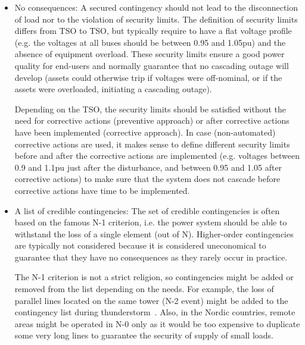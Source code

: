 \begin{itemize}
    \item No consequences: A secured contingency should not lead to the disconnection of load nor to the violation of security limits. The definition of security limits differs from TSO to TSO, but typically require to have a flat voltage profile (e.g. the voltages at all buses should be between 0.95 and 1.05pu) and the absence of equipment overload. These security limits ensure a good power quality for end-users and normally guarantee that no cascading outage will develop (assets could otherwise trip if voltages were off-nominal, or if the assets were overloaded, initiating a cascading outage).

    Depending on the TSO, the security limits should be satisfied without the need for corrective actions (preventive approach) or after corrective actions have been implemented (corrective approach). In case (non-automated) corrective actions are used, it makes sense to define different security limits before and after the corrective actions are implemented (e.g. voltages between 0.9 and 1.1pu just after the disturbance, and between 0.95 and 1.05 after corrective actions) to make sure that the system does not cascade before corrective actions have time to be implemented.

    \item A list of credible contingencies: The set of credible contingencies is often based on the famous N-1 criterion, i.e. the power system should be able to withstand the loss of a single element (out of N). Higher-order contingencies are typically not considered because it is considered uneconomical to guarantee that they have no consequences as they rarely occur in practice.

    The N-1 criterion is not a strict religion, so contingencies might be added or removed from the list depending on the needs. For example, the loss of parallel lines located on the same tower (N-2 event) might be added to the contingency list during thunderstorm~\cite{N-1-ENTSOE}. Also, in the Nordic countries, remote areas might be operated in N-0 only as it would be too expensive to duplicate some very long lines to guarantee the security of supply of small loads.


\end{itemize}
